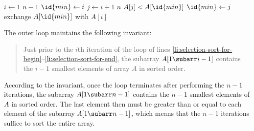 \indent\begin{codebox}
\li \For $i\gets1$ \To $n-1$ \label{li:selection-sort-for-begin}
\li     \Do $\id{min}\gets i$ \label{li:selection-sort-min-init}
\li         \For $j\gets i+1$ \To $n$
\li             \Do \If $A[j]<A[\id{min}]$
\li                     \Then $\id{min}\gets j$ \label{li:selection-sort-min-update}
                        \End
                \End
\li         exchange $A[\id{min}]$ with $A[i]$
        \End \label{li:selection-sort-for-end}
\end{codebox}

The outer  loop maintains the following invariant:
\begin{quote}
    Just prior to the $i$th iteration of the  loop of lines \ref{li:selection-sort-for-begin}--\ref{li:selection-sort-for-end}, the subarray $A[1\subarr i-1]$ contains the $i-1$ smallest elements of array $A$ in sorted order.
\end{quote}
According to the invariant, once the loop terminates after performing the $n-1$ iterations, the subarray $A[1\subarr n-1]$ contains the $n-1$ smallest elements of $A$ in sorted order.
The last element then must be greater than or equal to each element of the subarray $A[1\subarr n-1]$, which means that the $n-1$ iterations suffice to sort the entire array.

